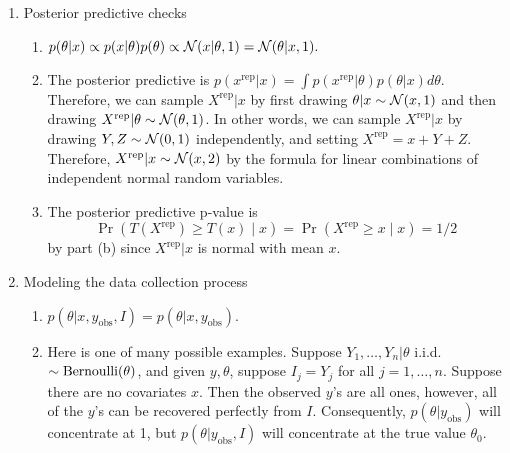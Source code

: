 \documentclass[12pt]{article}
\begin{document}
\begin{enumerate}
\item Posterior predictive checks
\begin{enumerate}
\item 
$p(\theta | x) \propto p(x | \theta) p(\theta) \propto \mathcal{N}(x | \theta,1) = \mathcal{N}(\theta | x,1).$
\item The posterior predictive is $p(x^\text{rep} | x) = \int p(x^\text{rep} | \theta) p(\theta | x) d \theta$. Therefore, we can sample $X^\text{rep} | x$ by first drawing $\theta | x \sim \mathcal{N}(x,1)$ and then drawing $X^\text{rep} | \theta \sim \mathcal{N}(\theta,1)$. In other words, we can sample $X^\text{rep} | x$ by drawing $Y,Z \sim \mathcal{N}(0,1)$ independently, and setting $X^\text{rep} = x + Y + Z$. Therefore, $X^\text{rep} | x \sim \mathcal{N}(x,2)$ by the formula for linear combinations of independent normal random variables.
\item The posterior predictive p-value is
$$ \Pr(T(X^\text{rep}) \geq T(x) \mid x) = \Pr(X^\text{rep} \geq x \mid x) = 1/2 $$
by part (b) since $X^\text{rep} | x$ is normal with mean $x$.
\end{enumerate}



\item Modeling the data collection process
\begin{enumerate}
\item $p(\theta | x,y_\text{obs},I) = p(\theta | x,y_\text{obs}). $
\item Here is one of many possible examples. Suppose $Y_1,\ldots,Y_n | \theta$ i.i.d. $\sim \operatorname*{Bernoulli}(\theta)$, and given $y,\theta$, suppose $I_j =  Y_j$ for all $j = 1,\ldots,n$. Suppose there are no covariates $x$. Then the observed $y$'s are all ones, however, all of the $y$'s can be recovered perfectly from $I$. Consequently, $p(\theta | y_\text{obs})$ will concentrate at 1, but $p(\theta | y_\text{obs},I)$ will concentrate at the true value $\theta_0$.
\end{enumerate}


\end{enumerate}
\end{document}
